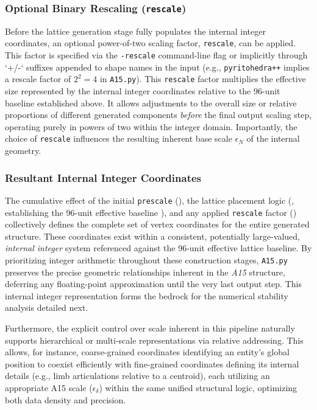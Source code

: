 \documentclass[10pt]{article}
\def\AAAB{\textit{A15}}
\begin{document}
\subsubsection{Optional Binary Rescaling (\texttt{rescale})}\label{subsubsec-scaling-rescale}
Before the lattice generation stage fully populates the internal integer coordinates, an optional power-of-two scaling factor, \texttt{rescale}, can be applied. This factor is specified via the \texttt{-rescale} command-line flag or implicitly through `+/-` suffixes appended to shape names in the input (e.g., \texttt{pyritohedra++} implies a rescale factor of $2^2=4$ in \texttt{A15.py}). This \texttt{rescale} factor multiplies the effective size represented by the internal integer coordinates relative to the 96-unit baseline established above. It allows adjustments to the overall size or relative proportions of different generated components \emph{before} the final output scaling step, operating purely in powers of two within the integer domain. Importantly, the choice of \texttt{rescale} influences the resulting inherent base scale $\epsilon_N$ of the internal geometry.

\subsubsection{Resultant Internal Integer Coordinates}\label{subsubsec-scaling-internal}
The cumulative effect of the initial \texttt{prescale} (), the lattice placement logic (, establishing the 96-unit effective baseline ), and any applied \texttt{rescale} factor () collectively defines the complete set of vertex coordinates for the entire generated structure. These coordinates exist within a consistent, potentially large-valued, \emph{internal integer} system referenced against the 96-unit effective lattice baseline. By prioritizing integer arithmetic throughout these construction stages, \texttt{A15.py} preserves the precise geometric relationships inherent in the \AAAB{} structure, deferring any floating-point approximation until the very last output step. This internal integer representation forms the bedrock for the numerical stability analysis detailed next.

Furthermore, the explicit control over scale inherent in this pipeline naturally supports hierarchical or multi-scale representations via relative addressing. This allows, for instance, coarse-grained coordinates identifying an entity's global position to coexist efficiently with fine-grained coordinates defining its internal details (e.g., limb articulations relative to a centroid), each utilizing an appropriate A15 scale ($\epsilon_\delta$) within the same unified structural logic, optimizing both data density and precision.
\end{document}
